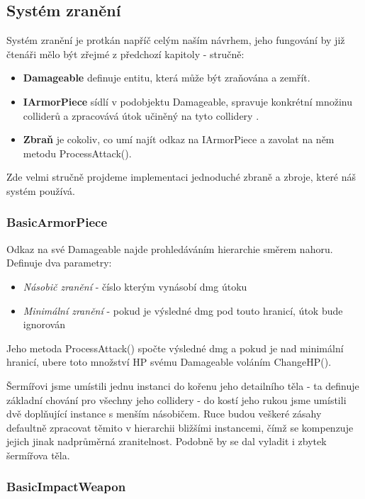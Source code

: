 \subsection{Systém zranění}

Systém zranění je protkán napříč celým naším návrhem, jeho fungování by již čtenáři mělo být zřejmé z předchozí kapitoly - stručně: 
\begin{itemize}
  \item \textbf{Damageable} definuje entitu, která může být zraňována a zemřít.
  \item \textbf{IArmorPiece} sídlí v podobjektu Damageable, spravuje konkrétní množinu colliderů a zpracovává útok učiněný na tyto collidery .
  \item \textbf{Zbraň} je cokoliv, co umí najít odkaz na IArmorPiece a zavolat na něm metodu ProcessAttack().
\end{itemize}
Zde velmi stručně projdeme implementaci jednoduché zbraně a zbroje, které náš systém používá.

\subsubsection*{BasicArmorPiece}

Odkaz na své Damageable najde prohledáváním hierarchie směrem nahoru. Definuje dva parametry:
\begin{itemize}
  \item \textit{Násobič zranění} - číslo kterým vynásobí dmg útoku  
  \item \textit{Minimální zranění} - pokud je výsledné dmg pod touto hranicí, útok bude ignorován
\end{itemize}

Jeho metoda ProcessAttack() spočte výsledné dmg a pokud je nad minimální hranicí, ubere toto množství HP svému Damageable voláním ChangeHP().

Šermířovi jsme umístili jednu instanci do kořenu jeho detailního těla - ta definuje základní chování pro všechny jeho collidery - do kostí jeho rukou jsme umístili dvě doplňující instance s menším násobičem. Ruce budou veškeré zásahy defaultně zpracovat těmito v hierarchii bližšími instancemi, čímž se kompenzuje jejich jinak nadprůměrná zranitelnost. Podobně by se dal vyladit i zbytek šermířova těla.

\subsubsection*{BasicImpactWeapon}


